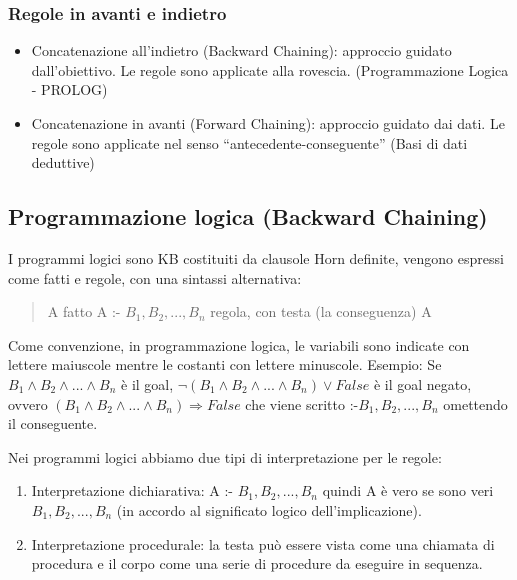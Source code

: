 \documentclass{article}
\begin{document}
\subsubsection{Regole in avanti e indietro}
\begin{itemize}
    \item Concatenazione all'indietro (Backward Chaining): approccio guidato dall'obiettivo. Le regole sono applicate alla rovescia. (Programmazione Logica - PROLOG)
    \item Concatenazione in avanti (Forward Chaining): approccio guidato dai dati. Le regole sono applicate nel senso “antecedente-conseguente” (Basi di dati deduttive)
\end{itemize}

\subsection{Programmazione logica (Backward Chaining)}
I programmi logici sono KB costituiti da clausole Horn definite, vengono espressi come fatti e regole, con una sintassi alternativa:
\begin{quote}
    A \quad fatto \newline
 	A :- $B_1, B_2, ... , B_n$ \quad regola, con testa (la conseguenza) A
\end{quote}
Come convenzione, in programmazione logica, le variabili sono indicate con lettere maiuscole mentre le costanti con lettere minuscole. \newline
Esempio: Se\newline
$B_1 \land B_2 \land ... \land B_n$ \quad è il goal, \newline
$\neg (B_1 \land B_2 \land ... \land B_n) \lor False$ \quad è il goal negato, ovvero \newline
$(B_1 \land B_2 \land ... \land B_n) \Rightarrow False$ \quad che viene scritto \newline
:-$B_1, B_2, ..., B_n$ \quad omettendo il conseguente. \clearpage

Nei programmi logici abbiamo due tipi di interpretazione per le regole:
\begin{enumerate}
    \item Interpretazione dichiarativa: A :- $B_1, B_2, ..., B_n$ quindi A è vero se sono veri $B_1, B_2, ..., B_n$ (in accordo al significato logico dell'implicazione).
    \item Interpretazione procedurale: la testa può essere vista come una chiamata di procedura e il corpo come una serie di procedure da eseguire in sequenza.
\end{enumerate}
\end{document}
